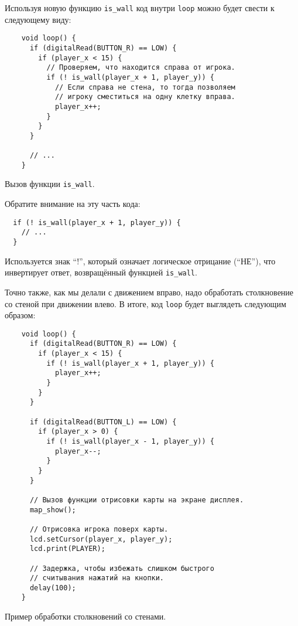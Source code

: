 \documentclass[../sparc.tex]{subfiles}
\begin{document}

Используя новую функцию \texttt{is\_wall} код внутри \texttt{loop} можно будет
свести к следующему виду:

\begin{listing}[H]
  \begin{verbatim}
    void loop() {
      if (digitalRead(BUTTON_R) == LOW) {
        if (player_x < 15) {
          // Проверяем, что находится справа от игрока.
          if (! is_wall(player_x + 1, player_y)) {
            // Если справа не стена, то тогда позволяем
            // игроку сместиться на одну клетку вправа.
            player_x++;
          }
        }
      }

      // ...
    }
  \end{verbatim}
  \caption{Вызов функции \texttt{is\_wall}.}
  \label{listing:game-dev-map-collisions-02}
\end{listing}

Обратите внимание на эту часть кода:

\begin{verbatim}
  if (! is_wall(player_x + 1, player_y)) {
    // ...
  }
\end{verbatim}

Используется знак ``!'', который означает логическое отрицание (``НЕ''), что
инвертирует ответ, возвращённый функцией \texttt{is\_wall}.

Точно также, как мы делали с движением вправо, надо обработать столкновение со
стеной при движении влево.  В итоге, код \texttt{loop} будет выглядеть следующим
образом:

\begin{listing}[H]
  \begin{verbatim}
    void loop() {
      if (digitalRead(BUTTON_R) == LOW) {
        if (player_x < 15) {
          if (! is_wall(player_x + 1, player_y)) {
            player_x++;
          }
        }
      }

      if (digitalRead(BUTTON_L) == LOW) {
        if (player_x > 0) {
          if (! is_wall(player_x - 1, player_y)) {
            player_x--;
          }
        }
      }

      // Вызов функции отрисовки карты на экране дисплея.
      map_show();

      // Отрисовка игрока поверх карты.
      lcd.setCursor(player_x, player_y);
      lcd.print(PLAYER);

      // Задержка, чтобы избежать слишком быстрого
      // считывания нажатий на кнопки.
      delay(100);
    }
  \end{verbatim}
  \caption{Пример обработки столкновений со стенами.}
  \label{listing:game-dev-map-collisions-03}
\end{listing}
\end{document}
